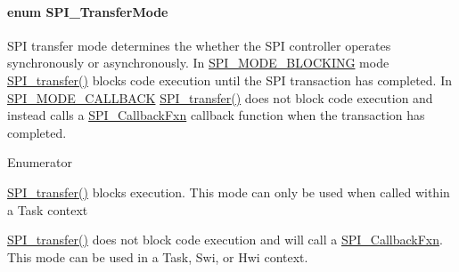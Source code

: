 \paragraph[{S\+P\+I\+\_\+\+Transfer\+Mode}]{\setlength{\rightskip}{0pt plus 5cm}enum {\bf S\+P\+I\+\_\+\+Transfer\+Mode}}\label{_s_p_i_8h_ab9ea76c6529d6076eee5e1c4a5a92c6f}


S\+P\+I transfer mode determines the whether the S\+P\+I controller operates synchronously or asynchronously. In \hyperlink{_s_p_i_8h_ab9ea76c6529d6076eee5e1c4a5a92c6fa0dfb2358e008316426895e7237c398e8}{S\+P\+I\+\_\+\+M\+O\+D\+E\+\_\+\+B\+L\+O\+C\+K\+I\+N\+G} mode \hyperlink{_s_p_i_8h_a989e17f96b54fcc3dc2cac5f8ac6bdb2}{S\+P\+I\+\_\+transfer()} blocks code execution until the S\+P\+I transaction has completed. In \hyperlink{_s_p_i_8h_ab9ea76c6529d6076eee5e1c4a5a92c6fa5631e69925c47a62a261c78ebbda39fb}{S\+P\+I\+\_\+\+M\+O\+D\+E\+\_\+\+C\+A\+L\+L\+B\+A\+C\+K} \hyperlink{_s_p_i_8h_a989e17f96b54fcc3dc2cac5f8ac6bdb2}{S\+P\+I\+\_\+transfer()} does not block code execution and instead calls a \hyperlink{_s_p_i_8h_a207e2d5a7e7ea5606b6995b6485ca015}{S\+P\+I\+\_\+\+Callback\+Fxn} callback function when the transaction has completed. 

\begin{Desc}
\item[Enumerator]\par
\begin{description}
\item[{\em 
S\+P\+I\+\_\+\+M\+O\+D\+E\+\_\+\+B\+L\+O\+C\+K\+I\+N\+G\label{_s_p_i_8h_ab9ea76c6529d6076eee5e1c4a5a92c6fa0dfb2358e008316426895e7237c398e8}
}]\hyperlink{_s_p_i_8h_a989e17f96b54fcc3dc2cac5f8ac6bdb2}{S\+P\+I\+\_\+transfer()} blocks execution. This mode can only be used when called within a Task context \item[{\em 
S\+P\+I\+\_\+\+M\+O\+D\+E\+\_\+\+C\+A\+L\+L\+B\+A\+C\+K\label{_s_p_i_8h_ab9ea76c6529d6076eee5e1c4a5a92c6fa5631e69925c47a62a261c78ebbda39fb}
}]\hyperlink{_s_p_i_8h_a989e17f96b54fcc3dc2cac5f8ac6bdb2}{S\+P\+I\+\_\+transfer()} does not block code execution and will call a \hyperlink{_s_p_i_8h_a207e2d5a7e7ea5606b6995b6485ca015}{S\+P\+I\+\_\+\+Callback\+Fxn}. This mode can be used in a Task, Swi, or Hwi context. \end{description}
\end{Desc}


